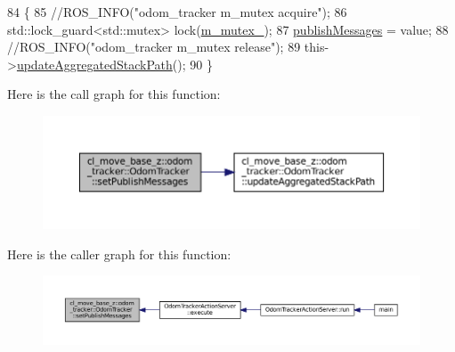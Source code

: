 \begin{DoxyCode}
84 \{
85     \textcolor{comment}{//ROS\_INFO("odom\_tracker m\_mutex acquire");}
86     std::lock\_guard<std::mutex> lock(\hyperlink{classcl__move__base__z_1_1odom__tracker_1_1OdomTracker_aa371639e1eee269273dec8d3ab9dba0f}{m\_mutex\_});
87     \hyperlink{classcl__move__base__z_1_1odom__tracker_1_1OdomTracker_a4f253d45ab5750dee3c2f18dd5599725}{publishMessages} = value;
88     \textcolor{comment}{//ROS\_INFO("odom\_tracker m\_mutex release");}
89     this->\hyperlink{classcl__move__base__z_1_1odom__tracker_1_1OdomTracker_a7922f1e1e688a2ed62d32d9914985a9f}{updateAggregatedStackPath}();
90 \}
\end{DoxyCode}
Here is the call graph for this function\+:
\nopagebreak
\begin{figure}[H]
\begin{center}
\leavevmode
\includegraphics[width=350pt]{classcl__move__base__z_1_1odom__tracker_1_1OdomTracker_a3b3cf9010e4e4fe4f96cfafd5a529517_cgraph}
\end{center}
\end{figure}
Here is the caller graph for this function\+:
\nopagebreak
\begin{figure}[H]
\begin{center}
\leavevmode
\includegraphics[width=350pt]{classcl__move__base__z_1_1odom__tracker_1_1OdomTracker_a3b3cf9010e4e4fe4f96cfafd5a529517_icgraph}
\end{center}
\end{figure}
\mbox{\label{classcl__move__base__z_1_1odom__tracker_1_1OdomTracker_a9f4989c6353022c2ec3b0546c09bf3bc}} 
